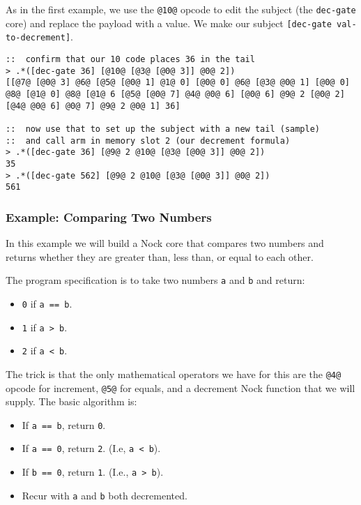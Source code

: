 \documentclass[twoside]{article}
\begin{document}
As in the first example, we use the \lstinline[style=inlinecode]{@10@} opcode to edit the subject (the \lstinline[style=inlinecode]{dec-gate} core) and replace the payload with a value.  We make our subject \lstinline[style=inlinecode]{[dec-gate val-to-decrement]}.

\begin{lstlisting}[style=listingcode]
::  confirm that our 10 code places 36 in the tail
> .*([dec-gate 36] [@10@ [@3@ [@0@ 3]] @0@ 2])
[[@7@ [@0@ 3] @6@ [@5@ [@0@ 1] @1@ 0] [@0@ 0] @6@ [@3@ @0@ 1] [@0@ 0] @8@ [@1@ 0] @8@ [@1@ 6 [@5@ [@0@ 7] @4@ @0@ 6] [@0@ 6] @9@ 2 [@0@ 2] [@4@ @0@ 6] @0@ 7] @9@ 2 @0@ 1] 36]

::  now use that to set up the subject with a new tail (sample)
::  and call arm in memory slot 2 (our decrement formula)
> .*([dec-gate 36] [@9@ 2 @10@ [@3@ [@0@ 3]] @0@ 2])
35
> .*([dec-gate 562] [@9@ 2 @10@ [@3@ [@0@ 3]] @0@ 2])
561
\end{lstlisting}

\subsubsection{Example:  Comparing Two Numbers}

In this example we will build a Nock core that compares two numbers and returns whether they are greater than, less than, or equal to each other.

The program specification is to take two numbers \lstinline[style=inlinecode]{a} and \lstinline[style=inlinecode]{b} and return:

\begin{itemize}
  \item  \lstinline[style=inlinecode]{0} if \lstinline[style=inlinecode]{a == b}.
  \item  \lstinline[style=inlinecode]{1} if \lstinline[style=inlinecode]{a > b}.
  \item  \lstinline[style=inlinecode]{2} if \lstinline[style=inlinecode]{a < b}.
\end{itemize}

The trick is that the only mathematical operators we have for this are the \lstinline[style=inlinecode]{@4@} opcode for increment, \lstinline[style=inlinecode]{@5@} for equals, and a decrement Nock function that we will supply.  The basic algorithm is:

\begin{itemize}
  \item  If \lstinline[style=inlinecode]{a == b}, return \lstinline[style=inlinecode]{0}.
  \item  If \lstinline[style=inlinecode]{a == 0}, return \lstinline[style=inlinecode]{2}.  (I.e, \lstinline[style=inlinecode]{a < b}).
  \item  If \lstinline[style=inlinecode]{b == 0}, return \lstinline[style=inlinecode]{1}.  (I.e., \lstinline[style=inlinecode]{a > b}).
  \item  Recur with \lstinline[style=inlinecode]{a} and \lstinline[style=inlinecode]{b} both decremented.
\end{itemize}
\end{document}

